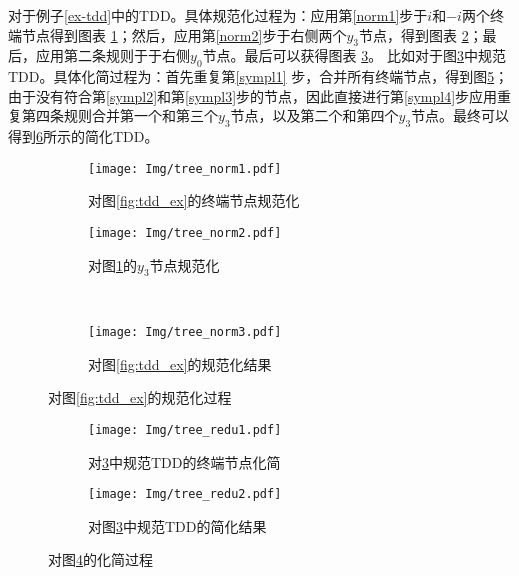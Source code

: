 \begin{example}
    对于例子\ref{ex-tdd}中的TDD。具体规范化过程为：应用第\ref{norm1}步于$i$和$-i$两个终端节点得到图表 \ref{fig:tdd-norma}；然后，应用第\ref{norm2}步于右侧两个$y_3$节点，得到图表 \ref{fig:tdd-normb}；最后，应用第二条规则于于右侧$y_0$节点。最后可以获得图表 \ref{fig:tdd-normc}。
比如对于图\ref{fig:tdd-normc}中规范TDD。具体化简过程为：首先重复第\ref{sympl1} 步，合并所有终端节点，得到图\ref{fig:tdd-redu1}；由于没有符合第\ref{sympl2}和第\ref{sympl3}步的节点，因此直接进行第\ref{sympl4}步应用重复第四条规则合并第一个和第三个$y_3$节点，以及第二个和第四个$y_3$节点。最终可以得到\ref{fig:tdd-redu2}所示的简化TDD。
\begin{figure}[!htbp]
    \centering
    \begin{subfigure}[b]{0.4\textwidth}
        \centering
        \texttt{[image: Img/tree\_norm1.pdf]}
        \caption{对图\ref{fig:tdd_ex}的终端节点规范化}
        \label{fig:tdd-norma}
    \end{subfigure}
    \begin{subfigure}[b]{0.4\textwidth}
        \centering
        \texttt{[image: Img/tree\_norm2.pdf]}
        \caption{对图\ref{fig:tdd-norma}的$y_3$节点规范化}
        \label{fig:tdd-normb}
    \end{subfigure}
    \\
    \begin{subfigure}[b]{0.8\textwidth}
        \centering
        \texttt{[image: Img/tree\_norm3.pdf]}
        \caption{对图\ref{fig:tdd_ex}的规范化结果}
        \label{fig:tdd-normc}
    \end{subfigure}
    \caption{对图\ref{fig:tdd_ex}的规范化过程}
    \label{fig:tdd-norm}
\end{figure}
\begin{figure}[!htbp]
    \centering
    \begin{subfigure}[b]{0.4\textwidth}
        \centering
        \texttt{[image: Img/tree\_redu1.pdf]}
        \caption{对\ref{fig:tdd-normc}中规范TDD的终端节点化简}
        \label{fig:tdd-redu1}
    \end{subfigure}
    \begin{subfigure}[b]{0.4\textwidth}
        \centering
        \texttt{[image: Img/tree\_redu2.pdf]}
        \caption{对图\ref{fig:tdd-normc}中规范TDD的简化结果}
        \label{fig:tdd-redu2}
    \end{subfigure}
    \caption{对图\ref{fig:tdd-norm}的化简过程}
    \label{fig:tdd-redu}
\end{figure}
\end{example}

